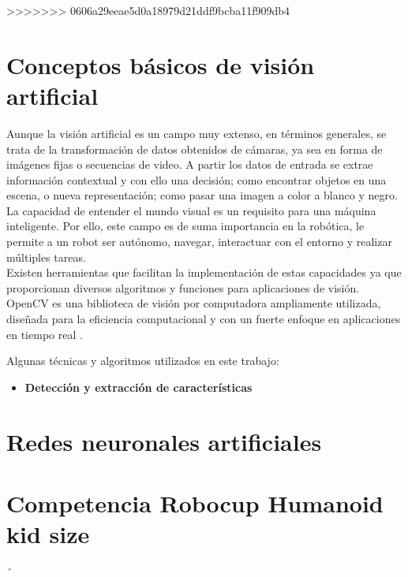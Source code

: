 >>>>>>> 0606a29eeae5d0a18979d21ddf9bcba11f909db4

\section{Conceptos básicos de visión artificial} 
Aunque la visión artificial es un campo muy extenso, en términos generales, se trata de la transformación de datos obtenidos de cámaras, ya sea en forma de imágenes fijas o secuencias de video. A partir los datos de entrada se extrae información contextual y con ello una decisión; como encontrar objetos en una escena, o nueva representación; como pasar una imagen a color a blanco y negro. La capacidad de entender el mundo visual es un requisito para una máquina inteligente. \cite{bradski2008learning} Por ello, este campo es de suma importancia en la robótica, le permite a un robot ser autónomo, navegar, interactuar con el entorno y realizar múltiples tareas. \\Existen herramientas que facilitan la implementación de estas capacidades ya que proporcionan diversos algoritmos y funciones para aplicaciones de visión.\\
OpenCV es una biblioteca de visión por computadora ampliamente utilizada, diseñada para la eficiencia computacional y con un fuerte enfoque en aplicaciones en tiempo real \cite{bradski2008learning}. 

Algunas técnicas y algoritmos utilizados en este trabajo:

\begin{itemize}
	\item \textbf{Detección y extracción de características}
\end{itemize}

\section{Redes neuronales artificiales}
    
\section{Competencia Robocup Humanoid kid size}
  ´